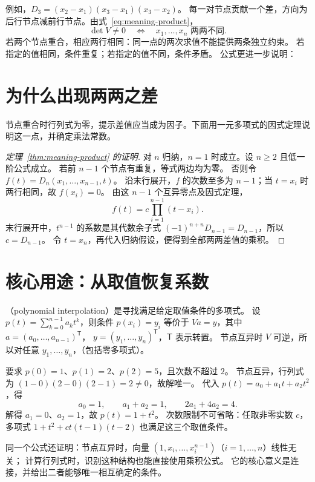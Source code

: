 \documentclass[UTF8,12pt,a4paper,fontset=fandol]{ctexart}
\begin{document}
例如，$D_3=(x_2-x_1)(x_3-x_1)(x_3-x_2)$。
每一对节点贡献一个差，方向为后行节点减前行节点。由式~\eqref{eq:meaning-product}，
\[
  \det V\ne0\quad\Longleftrightarrow\quad x_1,\ldots,x_n\text{ 两两不同}.
\]
若两个节点重合，相应两行相同：同一点的两次求值不能提供两条独立约束。
若指定的值相同，条件重复；若指定的值不同，条件矛盾。
公式更进一步说明：

\section{为什么出现两两之差}

节点重合时行列式为零，提示差值应当成为因子。下面用一元多项式的因式定理说明这一点，并确定乘法常数。

\begin{proof}[定理~\ref{thm:meaning-product} 的证明]
对 $n$ 归纳，$n=1$ 时成立。设 $n\geq2$ 且低一阶公式成立。
若前 $n-1$ 个节点有重复，等式两边均为零。
否则令 $f(t)=D_n(x_1,\ldots,x_{n-1},t)$。
沿末行展开，$f$ 的次数至多为 $n-1$；当 $t=x_i$ 时两行相同，故 $f(x_i)=0$。
由这 $n-1$ 个互异零点及因式定理，
\[
  f(t)=c\prod_{i=1}^{n-1}(t-x_i).
\]
末行展开中，$t^{n-1}$ 的系数是其代数余子式
$(-1)^{n+n}D_{n-1}=D_{n-1}$，所以 $c=D_{n-1}$。
令 $t=x_n$，再代入归纳假设，便得到全部两两差值的乘积。
\end{proof}

\section{核心用途：从取值恢复系数}

（polynomial interpolation）是寻找满足给定取值条件的多项式。
设 $p(t)=\sum_{k=0}^{n-1}a_kt^k$，则条件 $p(x_i)=y_i$ 等价于
$Va=y$，其中 $a=(a_0,\ldots,a_{n-1})^{\mathsf T}$，
$y=(y_1,\ldots,y_n)^{\mathsf T}$，$\mathsf T$ 表示转置。
节点互异时 $V$ 可逆，所以对任意 $y_1,\ldots,y_n$，（包括零多项式）。

\begin{example}[三个取值确定多项式]
要求 $p(0)=1$、$p(1)=2$、$p(2)=5$，且次数不超过 $2$。
节点互异，行列式为 $(1-0)(2-0)(2-1)=2\ne0$，故解唯一。
代入 $p(t)=a_0+a_1t+a_2t^2$，得
\[
  a_0=1,\qquad a_1+a_2=1,\qquad 2a_1+4a_2=4.
\]
解得 $a_1=0$、$a_2=1$，故 $p(t)=1+t^2$。
次数限制不可省略：任取非零实数 $c$，多项式
$1+t^2+ct(t-1)(t-2)$ 也满足这三个取值条件。
\end{example}

同一个公式还证明：节点互异时，向量 $(1,x_i,\ldots,x_i^{n-1})$（$i=1,\ldots,n$）线性无关；
计算行列式时，识别这种结构也能直接使用乘积公式。
它的核心意义是连接，并给出二者能够唯一相互确定的条件。
\end{document}
